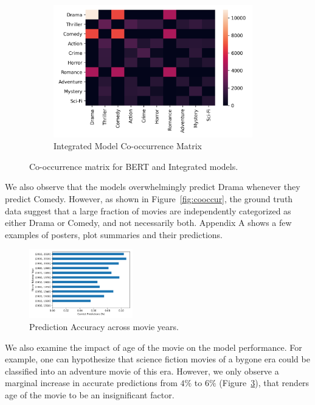 \documentclass[10pt]{article}
\begin{document}
\begin{figure}[!h]
\begin{subfigure}[l]{0.5\textwidth}
        \includegraphics[width=0.95\textwidth]{images/combinedCoOccurrence.png}
        \caption{Integrated Model Co-occurrence Matrix}
        \label{fig:combined_cooccurrence}
    \end{subfigure}
\caption{Co-occurrence matrix for BERT and Integrated models.}
\label{fig:coccurrence_models}
\end{figure}

We also observe that the models overwhelmingly predict Drama whenever they predict Comedy. However, as shown in Figure~\ref{fig:cooccur}, the ground truth data suggest that a large fraction of movies are independently categorized as either Drama or Comedy, and not necessarily both. Appendix A shows a few examples of posters, plot summaries and their predictions.

\begin{figure}[!h]
    \centering
    \includegraphics[width=0.4\textwidth]{images/yearlyPrediction.png}
    \caption{Prediction Accuracy across movie years.}
    \label{fig:yearlyPrediction}
\end{figure}

We also examine the impact of age of the movie on the model performance. For example, one can  hypothesize that science fiction movies of a bygone era could be classified into an adventure movie of this era. However, we only observe a marginal increase in accurate predictions from $4\%$ to $6\%$ (Figure~\ref{fig:yearlyPrediction}), that renders age of the movie to be an insignificant factor. 
\end{document}
